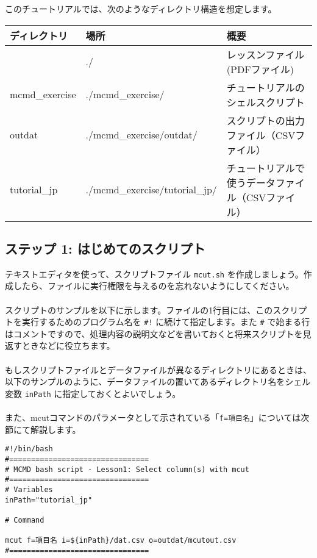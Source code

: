 このチュートリアルでは、次のようなディレクトリ構造を想定します。\\

\begin{table}[htbp]
{\small
\begin{tabular}{ l l l }
\hline
\textbf{ディレクトリ}   & \textbf{場所} & \textbf{概要}   \\
\hline
 & ./ & レッスンファイル (PDFファイル) \\
mcmd\_exercise & ./mcmd\_exercise/ & チュートリアルのシェルスクリプト \\
outdat & ./mcmd\_exercise/outdat/ & スクリプトの出力ファイル（CSVファイル）  \\
tutorial\_jp & ./mcmd\_exercise/tutorial\_jp/ & チュートリアルで使うデータファイル（CSVファイル）  \\

\hline
\end{tabular} 
}
\end{table} 


\subsection{ステップ 1: はじめてのスクリプト}

\noindent テキストエディタを使って、スクリプトファイル \verb|mcut.sh| を作成しましょう。作成したら、ファイルに実行権限を与えるのを忘れないようにしてください。
\\
\\
スクリプトのサンプルを以下に示します。ファイルの1行目には、このスクリプトを実行するためのプログラム名を \verb|#!| に続けて指定します。また \verb|#| で始まる行はコメントですので、処理内容の説明文などを書いておくと将来スクリプトを見返すときなどに役立ちます。
\\
\\
もしスクリプトファイルとデータファイルが異なるディレクトリにあるときは、以下のサンプルのように、データファイルの置いてあるディレクトリ名をシェル変数 \verb|inPath| に指定しておくとよいでしょう。
\\
\\
また、mcutコマンドのパラメータとして示されている「\verb|f=項目名|」については次節にて解説します。

\begin{verbatim}
#!/bin/bash
#================================
# MCMD bash script - Lesson1: Select column(s) with mcut
#================================
# Variables
inPath="tutorial_jp"

# Command 

mcut f=項目名 i=${inPath}/dat.csv o=outdat/mcutout.csv
#================================

\end{verbatim}

